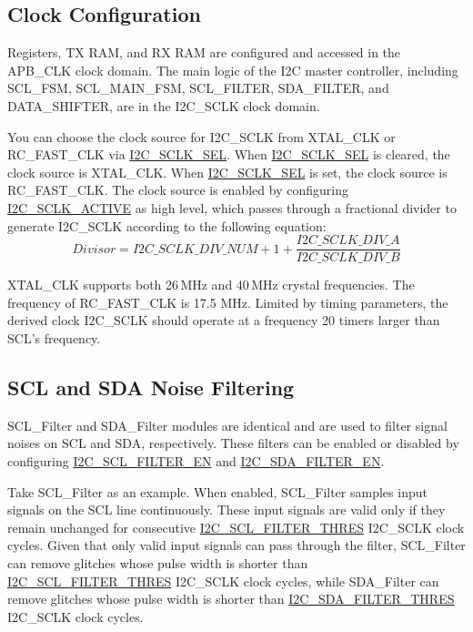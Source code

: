 \documentclass[main\_\_EN.tex]{subfiles}
\begin{document}
\subsection{Clock Configuration}
Registers, TX RAM, and RX RAM are configured and accessed in the APB\_CLK clock domain. The main logic of the I2C master controller, including SCL\_FSM, SCL\_MAIN\_FSM, SCL\_FILTER, SDA\_FILTER, and DATA\_SHIFTER, are in the I2C\_SCLK clock domain.


You can choose the clock source for I2C\_SCLK from XTAL\_CLK or RC\_FAST\_CLK via \hyperref[fielddesc:I2CSCLKSEL]{I2C\_SCLK\_SEL}. When \hyperref[fielddesc:I2CSCLKSEL]{I2C\_SCLK\_SEL} is cleared, the clock source is XTAL\_CLK. When \hyperref[fielddesc:I2CSCLKSEL]{I2C\_SCLK\_SEL} is set, the clock source is RC\_FAST\_CLK. The clock source is enabled by configuring \hyperref[fielddesc:I2CSCLKACTIVE]{I2C\_SCLK\_ACTIVE} as high level, which passes through a fractional divider to generate I2C\_SCLK according to the following equation:
\[
Divisor = I2C\_SCLK\_DIV\_ NUM + 1+\frac{ \hyperref[fielddesc:I2CSCLKDIVA]{I2C\_SCLK\_DIV\_A}}{\hyperref[fielddesc:I2CSCLKDIVB]{I2C\_SCLK\_DIV\_B}}
\]

XTAL\_CLK supports both 26 MHz and 40 MHz crystal frequencies. The frequency of RC\_FAST\_CLK is 17.5 MHz. Limited by timing parameters, the derived clock I2C\_SCLK should operate at a frequency 20 timers larger than SCL's frequency.

\subsection{SCL and SDA Noise Filtering}
SCL\_Filter and SDA\_Filter modules are identical and are used to filter signal noises on SCL and SDA, respectively. These filters can be enabled or disabled by configuring \hyperref[fielddesc:I2CSCLFILTEREN]{I2C\_SCL\_FILTER\_EN} and \hyperref[fielddesc:I2CSDAFILTEREN]{I2C\_SDA\_FILTER\_EN}.

Take SCL\_Filter as an example. When enabled, SCL\_Filter samples input signals on the SCL line continuously. These input signals are valid only if they remain unchanged for consecutive \hyperref[fielddesc:I2CSCLFILTERTHRES]{I2C\_SCL\_FILTER\_THRES} I2C\_SCLK clock cycles. Given that only valid input signals can pass through the filter, SCL\_Filter can remove glitches whose pulse width is shorter than \hyperref[fielddesc:I2CSCLFILTERTHRES]{I2C\_SCL\_FILTER\_THRES} I2C\_SCLK clock cycles, while SDA\_Filter can remove glitches whose pulse width is shorter than \hyperref[fielddesc:I2CSDAFILTERTHRES]{I2C\_SDA\_FILTER\_THRES} I2C\_SCLK clock cycles.
\end{document}
